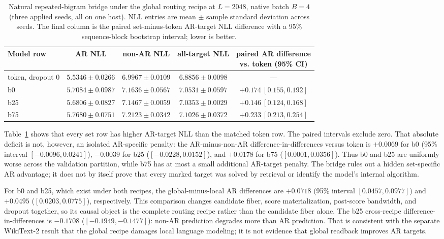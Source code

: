 \documentclass{article}
\theoremstyle{plain}
\theoremstyle{definition}
\theoremstyle{remark}
\begin{document}
\begin{table}[htbp]
\centering
\caption{Natural repeated-bigram bridge under the global routing recipe at
$L=2048$, native batch $B=4$ (three applied seeds, all on one host).  NLL
entries are mean $\pm$ sample standard deviation across seeds.  The final
column is the paired set-minus-token AR-target NLL difference with a 95\%
sequence-block bootstrap interval; lower is better.}
\label{tab:mrp2-ar-hits-global-bridge}
\small
\setlength{\tabcolsep}{4pt}
\begin{tabular}{@{}lcccc@{}}
\toprule
Model row & AR NLL & non-AR NLL & all-target NLL & \shortstack{paired AR difference\\vs. token (95\% CI)} \\
\midrule
token, dropout 0 & $\mathbf{5.5346\pm0.0266}$ & $\mathbf{6.9967\pm0.0109}$ & $\mathbf{6.8856\pm0.0098}$ & --- \\
b0 & $5.7084\pm0.0987$ & $7.1636\pm0.0567$ & $7.0531\pm0.0597$ & $+0.174\ [0.155,0.192]$ \\
b25 & $5.6806\pm0.0827$ & $7.1467\pm0.0059$ & $7.0353\pm0.0029$ & $+0.146\ [0.124,0.168]$ \\
b75 & $5.7680\pm0.0751$ & $7.2123\pm0.0342$ & $7.1026\pm0.0372$ & $+0.233\ [0.213,0.254]$ \\
\bottomrule
\end{tabular}
\end{table}
\FloatBarrier

Table~\ref{tab:mrp2-ar-hits-global-bridge} shows that every set row has higher
AR-target NLL than the matched token row.  The paired intervals exclude zero.
That absolute deficit is not, however, an isolated AR-specific penalty: the
AR-minus-non-AR difference-in-differences versus token is $+0.0069$ for b0
(95\% interval $[-0.0096,0.0241]$), $-0.0039$ for b25
($[-0.0228,0.0152]$), and $+0.0178$ for b75
($[0.0001,0.0356]$).  Thus b0 and b25 are uniformly worse across the validation
partition, while b75 has at most a small additional AR-target penalty.  The
bridge rules out a hidden set-specific AR advantage; it does not by itself
prove that every marked target was solved by retrieval or identify the model's
internal algorithm.

For b0 and b25, which exist under both recipes, the global-minus-local AR
differences are $+0.0718$ (95\% interval $[0.0457,0.0977]$) and $+0.0495$
($[0.0203,0.0775]$), respectively.  This comparison changes candidate fiber,
score materialization, post-score bandwidth, and dropout together, so its
causal object is the complete routing recipe rather than the candidate fiber
alone.  The b25 cross-recipe difference-in-differences is $-0.1708$
($[-0.1949,-0.1477]$): non-AR prediction degrades more than AR prediction.
That is consistent with the separate WikiText-2 result that the global recipe
damages local language modeling; it is not evidence that global readback
improves AR targets.
\end{document}
